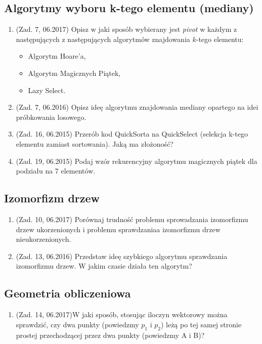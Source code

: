 \documentclass[10pt]{article}%
\begin{document}
\subsection*{Algorytmy wyboru k-tego elementu (mediany)}
\begin{enumerate}
\item (Zad. 7, 06.2017) Opisz w jaki sposób wybierany jest \emph{pivot} w każdym z następujących z następujących algorytmów znajdowania $k$-tego elementu: 
\begin{itemize}
\item Algorytm Hoare'a,
\item Algorytm Magicznych Piątek,
\item Lazy Select.
\end{itemize}

\item (Zad. 7, 06.2016) Opisz ideę algorytmu znajdowania mediany opartego na idei próbkowania losowego.

\item (Zad. 16, 06.2015) Przerób kod QuickSorta na QuickSelect (selekcja k-tego elementu zamiast sortowania). Jaką ma złożoność?

\item (Zad. 19, 06.2015) Podaj wzór rekurencyjny algorytmu magicznych piątek dla podziału na 7 elementów. 
\end{enumerate}
\subsection*{Izomorfizm drzew}
\begin{enumerate}
\item (Zad. 10, 06.2017) Porównaj trudność problemu sprowadzania izomorfizmu drzew ukorzenionych i problemu sprawdzaniaa izomorfizmu drzew nieukorzenionych.

\item (Zad. 13, 06.2016) Przedstaw ideę szybkiego algorytmu sprawdzania izomorfizmu drzew. W jakim czasie działa ten algorytm?
\end{enumerate}
\subsection*{Geometria obliczeniowa}
\begin{enumerate}
\item (Zad. 14, 06.2017)W jaki sposób, stosując iloczyn wektorowy można sprawdzić, czy dwa punkty (powiedzmy $p_1$ i $p_2$) leżą po tej samej stronie prostej przechodzącej przez dwa punkty (powiedzmy A i B)?
\end{enumerate}
\end{document}
